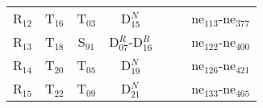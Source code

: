 \begin{table}[H]
{{\begin{tabular}{ c c c c c c c }
                    R$_{12}$ & T$_{16}$ & T$_{03}$ & D$_{15}^{N}$ &  &  & ne$_{113}$-ne$_{377}$\\
                    R$_{13}$ & T$_{18}$ & S$_{91}$ & D$_{07}^{R}$-D$_{16}^{R}$ &  &  & ne$_{122}$-ne$_{400}$\\
                    R$_{14}$ & T$_{20}$ & T$_{05}$ & D$_{19}^{N}$ &  &  & ne$_{126}$-ne$_{421}$\\
                    R$_{15}$ & T$_{22}$ & T$_{09}$ & D$_{21}^{N}$ &  &  & ne$_{133}$-ne$_{465}$\\
                \hline
            \end{tabular}
        }
     }
    \end{table}

	
	

